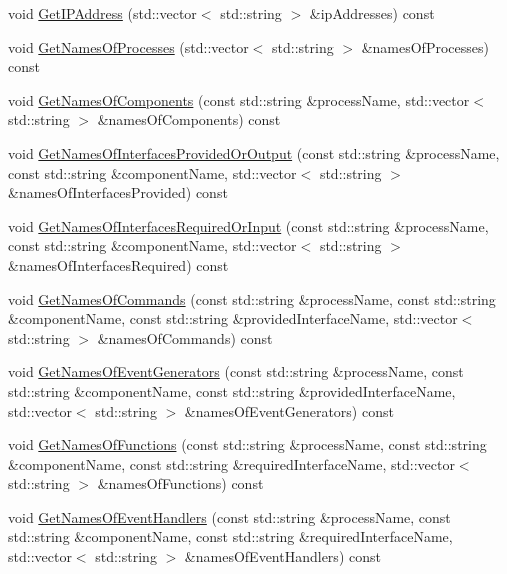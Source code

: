 \begin{DoxyCompactItemize}
\item 
void \hyperlink{classmts_manager_global_aabf5b3d4a303ea79fbd28d85721c7c13}{Get\-I\-P\-Address} (std\-::vector$<$ std\-::string $>$ \&ip\-Addresses) const 
\item 
void \hyperlink{classmts_manager_global_a79ff98c39ee4b67c0ae7d00c4381f18a}{Get\-Names\-Of\-Processes} (std\-::vector$<$ std\-::string $>$ \&names\-Of\-Processes) const 
\item 
void \hyperlink{classmts_manager_global_a5235e3495d9963069ed7ca53de040a31}{Get\-Names\-Of\-Components} (const std\-::string \&process\-Name, std\-::vector$<$ std\-::string $>$ \&names\-Of\-Components) const 
\item 
void \hyperlink{classmts_manager_global_a612adaf5ac9b1392b1ff467dcaa2f8b3}{Get\-Names\-Of\-Interfaces\-Provided\-Or\-Output} (const std\-::string \&process\-Name, const std\-::string \&component\-Name, std\-::vector$<$ std\-::string $>$ \&names\-Of\-Interfaces\-Provided) const 
\item 
void \hyperlink{classmts_manager_global_af83cc964e33db5d3b241239d922d8a82}{Get\-Names\-Of\-Interfaces\-Required\-Or\-Input} (const std\-::string \&process\-Name, const std\-::string \&component\-Name, std\-::vector$<$ std\-::string $>$ \&names\-Of\-Interfaces\-Required) const 
\item 
void \hyperlink{classmts_manager_global_a7d089967d11aa6e1b3786ea834b43fc5}{Get\-Names\-Of\-Commands} (const std\-::string \&process\-Name, const std\-::string \&component\-Name, const std\-::string \&provided\-Interface\-Name, std\-::vector$<$ std\-::string $>$ \&names\-Of\-Commands) const 
\item 
void \hyperlink{classmts_manager_global_a0cd6e7c9a0c3fdbbfdacdbdd03119a4b}{Get\-Names\-Of\-Event\-Generators} (const std\-::string \&process\-Name, const std\-::string \&component\-Name, const std\-::string \&provided\-Interface\-Name, std\-::vector$<$ std\-::string $>$ \&names\-Of\-Event\-Generators) const 
\item 
void \hyperlink{classmts_manager_global_ab8c6e3da89e4e76a3bdb29097e5d0a78}{Get\-Names\-Of\-Functions} (const std\-::string \&process\-Name, const std\-::string \&component\-Name, const std\-::string \&required\-Interface\-Name, std\-::vector$<$ std\-::string $>$ \&names\-Of\-Functions) const 
\item 
void \hyperlink{classmts_manager_global_a2d0ce773b7d8d71f775bec15ce5d9f1b}{Get\-Names\-Of\-Event\-Handlers} (const std\-::string \&process\-Name, const std\-::string \&component\-Name, const std\-::string \&required\-Interface\-Name, std\-::vector$<$ std\-::string $>$ \&names\-Of\-Event\-Handlers) const 

\end{DoxyCompactItemize}
